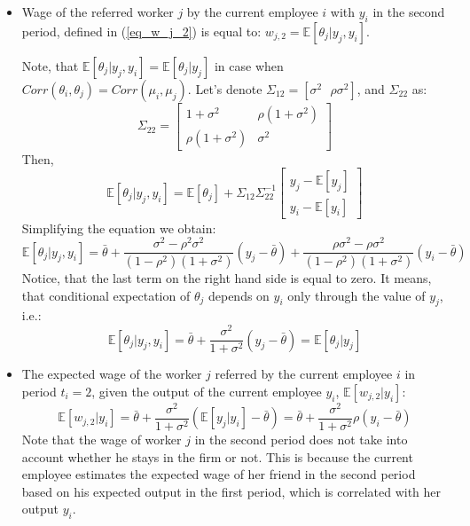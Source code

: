 \documentclass[12pt]{article}
\begin{document}
\begin{itemize}
    \item Wage of the referred worker $j$ by the current employee $i$ with $y_i$ in the second period, defined in (\ref{eq_w_j_2}) is equal to: $w_{j,2} = \mathbb{E}[\theta_j|y_j,y_i]$. 
    
    Note, that $\mathbb{E}[\theta_j|y_j,y_i] = \mathbb{E}[\theta_j|y_j]$ in case when $Corr(\theta_i,\theta_j)= Corr(\mu_i,\mu_j)$. Let's denote $\Sigma_{12} = [\sigma^2 \text{    } \rho\sigma^2]$, and $\Sigma_{22}$ as:
    \begin{equation*}
        \Sigma_{22} = 
        \begin{bmatrix}
        1+\sigma^2 & \rho (1+\sigma^2)\\
        \rho (1+\sigma^2)& \sigma^2
        \end{bmatrix}
    \end{equation*}
    Then, 
    \begin{equation*}
    \mathbb{E}[\theta_j|y_j,y_i] = \mathbb{E}[\theta_j]+ \Sigma_{12}\Sigma_{22}^{-1}
    \begin{bmatrix}
        y_j-\mathbb{E}[y_j]\\
        y_i-\mathbb{E}[y_i]
    \end{bmatrix}
    \end{equation*}
    Simplifying the equation we obtain:
    \begin{equation*}
        \mathbb{E}[\theta_j|y_j,y_i] = \bar{\theta}+ \frac{\sigma^2-\rho^2\sigma^2}{(1-\rho^2)(1+\sigma^2)}(y_j - \bar{\theta})+ \frac{\rho\sigma^2-\rho\sigma^2}{(1-\rho^2)(1+\sigma^2)}(y_i - \bar{\theta})
    \end{equation*}
    Notice, that the last term on the right hand side is equal to zero. It means, that conditional expectation of $\theta_j$ depends on $y_i$ only through the value of $y_j$, i.e.:
    \begin{equation*}
        \mathbb{E}[\theta_j|y_j,y_i] = \bar{\theta}+\frac{\sigma^2}{1+\sigma^2}(y_j - \bar{\theta}) = \mathbb{E}[\theta_j|y_j]
    \end{equation*}
    
    \item The expected wage of the worker $j$ referred by the current employee $i$ in period $t_i = 2$, given the output of the current employee $y_i$, $\mathbb{E}[w_{j,2}|y_i]$:
    \begin{equation}\label{eq:w_j_2_cond_y_i}
       \mathbb{E}[w_{j,2}|y_i] =  \bar{\theta}+\frac{\sigma^2}{1+\sigma^2}(\mathbb{E}[y_j | y_i] - \bar{\theta}) = \bar{\theta}+\frac{\sigma^2}{1+\sigma^2}\rho(y_i-\bar{\theta})
    \end{equation}
    Note that the wage of worker $j$ in the second period does not take into account whether he stays in the firm or not.  This is because the current employee estimates the expected wage of her friend in the second period based on his expected output in the first period, which is correlated with her output $y_i$. %


\end{itemize}
\end{document}
